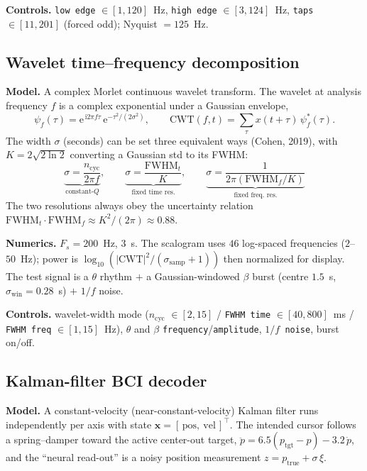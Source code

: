 \documentclass[11pt]{article}
\newcommand{\param}[1]{\textcolor{neonmag}{\texttt{#1}}}
\newcommand{\E}{\mathrm{e}}
\newcommand{\ii}{\mathrm{i}}
\begin{document}
\textbf{Controls.} \param{low edge} $\in[1,120]$~Hz, \param{high edge} $\in[3,124]$~Hz,
\param{taps} $\in[11,201]$ (forced odd); Nyquist $=125$~Hz.

\subsection{Wavelet time--frequency decomposition}

\textbf{Model.} A complex Morlet continuous wavelet transform. The wavelet at analysis
frequency $f$ is a complex exponential under a Gaussian envelope,
\[
\psi_f(\tau) = \E^{\,\ii 2\pi f \tau}\,\E^{-\tau^2/(2\sigma^2)}, \qquad
\text{CWT}(f,t) = \sum_\tau x(t+\tau)\,\psi_f^{*}(\tau).
\]
The width $\sigma$ (seconds) can be set three equivalent ways (Cohen, 2019), with
$K = 2\sqrt{2\ln 2}$ converting a Gaussian std to its FWHM:
\[
\underbrace{\sigma = \frac{n_{\text{cyc}}}{2\pi f}}_{\text{constant-}Q},\qquad
\underbrace{\sigma = \frac{\text{FWHM}_t}{K}}_{\text{fixed time res.}},\qquad
\underbrace{\sigma = \frac{1}{2\pi(\text{FWHM}_f/K)}}_{\text{fixed freq.\ res.}}
\]
The two resolutions always obey the uncertainty relation
$\text{FWHM}_t \cdot \text{FWHM}_f \approx K^2/(2\pi) \approx 0.88$.

\textbf{Numerics.} $F_s = 200$~Hz, $3$~s. The scalogram uses $46$ log-spaced frequencies
($2$--$50$~Hz); power is $\log_{10}(|\text{CWT}|^2/(\sigma_{\text{samp}}{+}1))$ then
normalized for display. The test signal is a $\theta$ rhythm $+$ a Gaussian-windowed $\beta$
burst (centre $1.5$~s, $\sigma_{\text{win}}=0.28$~s) $+$ $1/f$ noise.

\textbf{Controls.} wavelet-width mode (\param{$n_{\text{cyc}}$} $\in[2,15]$ /
\param{FWHM time} $\in[40,800]$~ms / \param{FWHM freq} $\in[1,15]$~Hz),
$\theta$ and $\beta$ \param{frequency}/\param{amplitude}, \param{$1/f$ noise}, burst on/off.

\subsection{Kalman-filter BCI decoder}

\textbf{Model.} A constant-velocity (near-constant-velocity) Kalman filter runs independently
per axis with state $\mathbf x = [\,\text{pos},\ \text{vel}\,]^\top$. The intended cursor follows
a spring--damper toward the active center-out target, $\ddot p = 6.5(p_{\text{tgt}}-p) - 3.2\,\dot p$,
and the ``neural read-out'' is a noisy position measurement $z = p_{\text{true}} + \sigma\,\xi$.
\end{document}
